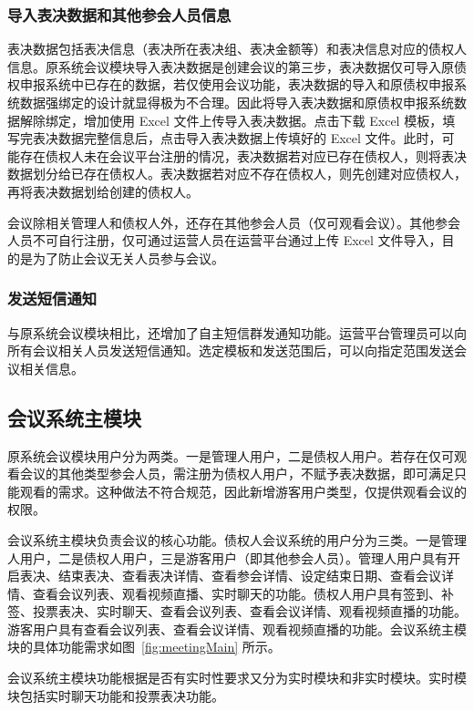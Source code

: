 \subsubsection{导入表决数据和其他参会人员信息}
表决数据包括表决信息（表决所在表决组、表决金额等）和表决信息对应的债权人信息。原系统会议模块导入表决数据是创建会议的第三步，表决数据仅可导入原债权申报系统中已存在的数据，若仅使用会议功能，表决数据的导入和原债权申报系统数据强绑定的设计就显得极为不合理。因此将导入表决数据和原债权申报系统数据解除绑定，增加使用 Excel 文件上传导入表决数据。点击下载 Excel 模板，填写完表决数据完整信息后，点击导入表决数据上传填好的 Excel 文件。此时，可能存在债权人未在会议平台注册的情况，表决数据若对应已存在债权人，则将表决数据划分给已存在债权人。表决数据若对应不存在债权人，则先创建对应债权人，再将表决数据划给创建的债权人。

会议除相关管理人和债权人外，还存在其他参会人员（仅可观看会议）。其他参会人员不可自行注册，仅可通过运营人员在运营平台通过上传 Excel 文件导入，目的是为了防止会议无关人员参与会议。

\subsubsection{发送短信通知}
与原系统会议模块相比，还增加了自主短信群发通知功能。运营平台管理员可以向所有会议相关人员发送短信通知。选定模板和发送范围后，可以向指定范围发送会议相关信息。

\subsection{会议系统主模块}

原系统会议模块用户分为两类。一是管理人用户，二是债权人用户。若存在仅可观看会议的其他类型参会人员，需注册为债权人用户，不赋予表决数据，即可满足只能观看的需求。这种做法不符合规范，因此新增游客用户类型，仅提供观看会议的权限。

会议系统主模块负责会议的核心功能。债权人会议系统的用户分为三类。一是管理人用户，二是债权人用户，三是游客用户（即其他参会人员）。管理人用户具有开启表决、结束表决、查看表决详情、查看参会详情、设定结束日期、查看会议详情、查看会议列表、观看视频直播、实时聊天的功能。债权人用户具有签到、补签、投票表决、实时聊天、查看会议列表、查看会议详情、观看视频直播的功能。游客用户具有查看会议列表、查看会议详情、观看视频直播的功能。会议系统主模块的具体功能需求如图~\ref{fig:meetingMain} 所示。

会议系统主模块功能根据是否有实时性要求又分为实时模块和非实时模块。实时模块包括实时聊天功能和投票表决功能。

